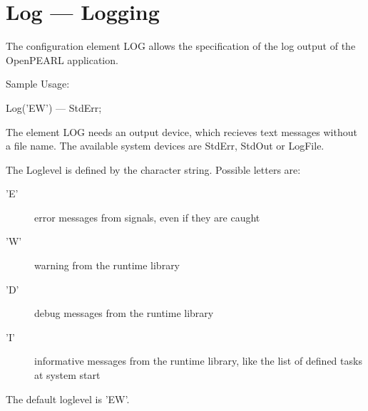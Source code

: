 
\section{Log --- Logging}
The configuration element LOG allows the specification of the 
log output of the OpenPEARL application.

Sample Usage:
\begin{PEARLCode}
Log('EW') --- StdErr;
\end{PEARLCode}

The element LOG needs an output device,
which recieves text messages without a file name.
The available system devices are StdErr, StdOut or LogFile.

The Loglevel is defined by the character string. Possible letters are:
\begin{description}
\item['E'] error messages from signals, even if they are caught
\item['W'] warning from the runtime library
\item['D'] debug messages from the runtime library
\item['I'] informative messages from the runtime library, like the 
    list of defined tasks at system start
\end{description}

The default loglevel is 'EW'.

